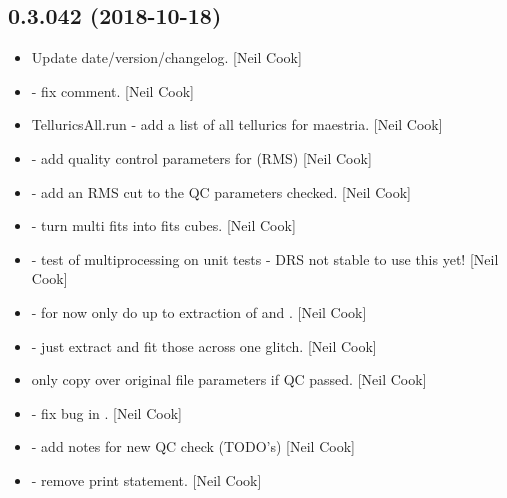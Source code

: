 \documentclass[a4paper,10pt,english]{report}
\begin{document}
\subsection{0.3.042 (2018-10-18)}
\label{\detokenize{misc/changelog:id289}}\begin{itemize}
\item {} 
Update date/version/changelog. {[}Neil Cook{]}

\item {} 
 - fix comment. {[}Neil Cook{]}

\item {} 
TelluricsAll.run - add a list of all tellurics for maestria. {[}Neil
Cook{]}

\item {} 
 - add quality control parameters for 
(RMS) {[}Neil Cook{]}

\item {} 
 - add an RMS cut to the QC parameters checked. {[}Neil
Cook{]}

\item {} 
 - turn multi fits into fits cubes. {[}Neil Cook{]}

\item {} 
 - test of multiprocessing on unit tests - DRS
not stable to use this yet! {[}Neil Cook{]}

\item {} 
 - for now only do up to extraction of  and
. {[}Neil Cook{]}

\item {} 
 - just extract and fit those across one glitch. {[}Neil
Cook{]}

\item {} 
 only copy over original file parameters if QC passed.
{[}Neil Cook{]}

\item {} 
 - fix bug in . {[}Neil Cook{]}

\item {} 
 - add notes for new QC check (TODO’s) {[}Neil Cook{]}

\item {} 
 - remove print statement. {[}Neil Cook{]}


\end{itemize}
\end{document}
